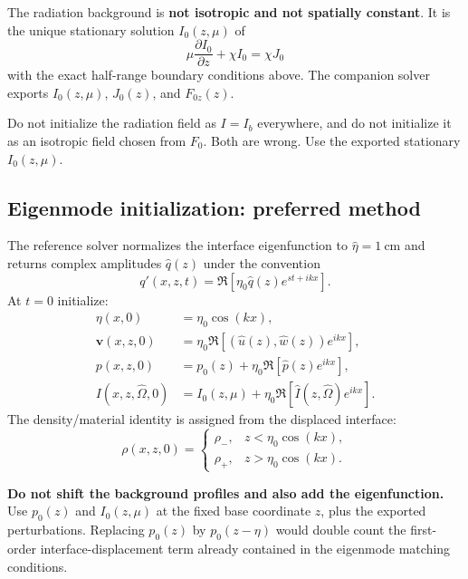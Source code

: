 \documentclass[11pt]{article}
\newcommand{\vect}[1]{\bm{#1}}
\newcommand{\Oh}{\hat{\Omega}}
\newcommand{\Ihat}{\widehat I}
\newcommand{\whatv}{\widehat w}
\newcommand{\uhat}{\widehat u}
\newcommand{\phat}{\widehat p}
\begin{document}
The radiation background is \textbf{not isotropic and not spatially constant}. It is the unique stationary solution $I_0(z,\mu)$ of
\begin{equation}
\mu\frac{\partial I_0}{\partial z}+\chi I_0=\chi J_0
\end{equation}
with the exact half-range boundary conditions above. The companion solver exports $I_0(z,\mu)$, $J_0(z)$, and $F_{0z}(z)$.

\begin{warningbox}
Do not initialize the radiation field as $I=I_b$ everywhere, and do not initialize it as an isotropic field chosen from $F_0$. Both are wrong. Use the exported stationary $I_0(z,\mu)$.
\end{warningbox}

\subsection{Eigenmode initialization: preferred method}
The reference solver normalizes the interface eigenfunction to $\widehat\eta=1\ \mathrm{cm}$ and returns complex amplitudes $\widehat q(z)$ under the convention
\begin{equation}
q'(x,z,t)=\Re\left[\eta_0\widehat q(z)e^{st+ikx}\right].
\end{equation}
At $t=0$ initialize:
\begin{align}
\eta(x,0)&=\eta_0\cos(kx),\\
\vect v(x,z,0)&=\eta_0\Re\left[(\uhat(z),\whatv(z))e^{ikx}\right],\\
p(x,z,0)&=p_0(z)+\eta_0\Re\left[\phat(z)e^{ikx}\right],\\
I(x,z,\Oh,0)&=I_0(z,\mu)+\eta_0\Re\left[\Ihat(z,\Oh)e^{ikx}\right].
\end{align}
The density/material identity is assigned from the displaced interface:
\begin{equation}
\rho(x,z,0)=\begin{cases}
\rho_-,&z<\eta_0\cos(kx),\\
\rho_+,&z>\eta_0\cos(kx).
\end{cases}
\end{equation}

\begin{riskbox}
\textbf{Do not shift the background profiles and also add the eigenfunction.} Use $p_0(z)$ and $I_0(z,\mu)$ at the fixed base coordinate $z$, plus the exported perturbations. Replacing $p_0(z)$ by $p_0(z-\eta)$ would double count the first-order interface-displacement term already contained in the eigenmode matching conditions.
\end{riskbox}
\end{document}
